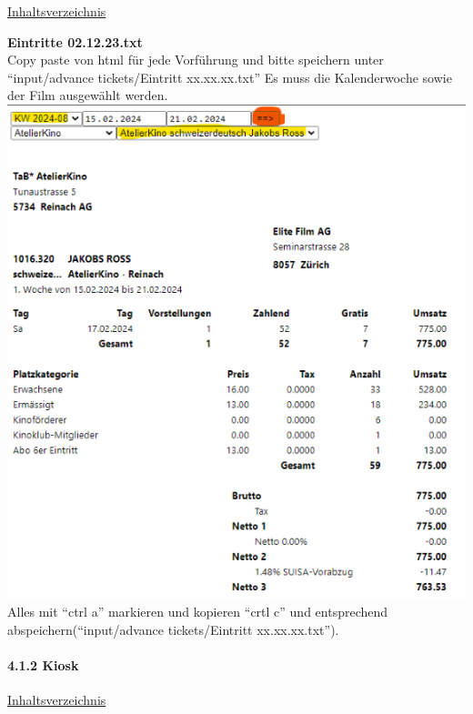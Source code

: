 \documentclass[
]{article}
\begin{document}
\hyperref[Inhaltsverzeichnis]{Inhaltsverzeichnis}

\textbf{Eintritte 02.12.23.txt}\\
Copy paste von html für jede Vorführung und bitte speichern unter
``input/advance tickets/Eintritt xx.xx.xx.txt'' Es muss die
Kalenderwoche sowie der Film ausgewählt werden.\\
\includegraphics{doc/eintritt.png}\\
Alles mit ``ctrl a'' markieren und kopieren ``crtl c'' und entsprechend
abspeichern(``input/advance tickets/Eintritt xx.xx.xx.txt'').

\paragraph{4.1.2 Kiosk}\label{kiosk}

\hyperref[Inhaltsverzeichnis]{Inhaltsverzeichnis}
\end{document}
